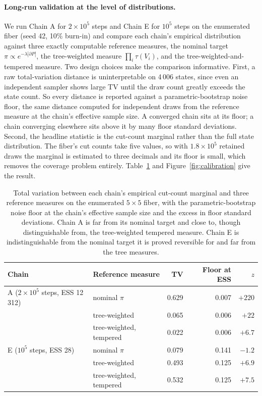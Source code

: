 \documentclass[11pt]{article}
\begin{document}
\paragraph{Long-run validation at the level of distributions.}\label{sec:exp-longrun}
We run Chain A for $2 \times 10^5$ steps and Chain E for $10^5$ steps
on the enumerated fiber (seed 42, 10\% burn-in) and compare each
chain's empirical distribution against three exactly computable
reference measures, the nominal target
$\pi \propto e^{-\lambda|\partial P|}$, the tree-weighted measure
$\prod_i \tau(V_i)$, and the tree-weighted-and-tempered measure. Two
design choices make the comparison informative. First, a raw
total-variation distance is uninterpretable on 4\,006 states, since
even an independent sampler shows large TV until the draw count
greatly exceeds the state count. So every distance is reported
against a parametric-bootstrap noise floor, the same distance
computed for independent draws from the reference measure at the
chain's effective sample size. A converged chain sits at its floor; a
chain converging elsewhere sits above it by many floor standard
deviations. Second, the headline statistic is the cut-count marginal
rather than the full state distribution. The fiber's cut counts take
five values, so with $1.8 \times 10^5$ retained draws the marginal is
estimated to three decimals and its floor is small, which removes the
coverage problem entirely. Table~\ref{tab:calibration-tv} and
Figure~\ref{fig:calibration} give the result.

\begin{table}[htbp]
\centering
\small
\begin{tabular}{llrrr}
\toprule
Chain & Reference measure & TV & Floor at ESS & $z$ \\
\midrule
A ($2\times10^5$ steps, ESS 12\,312) & nominal $\pi$ & 0.629 & 0.007 & $+220$ \\
 & tree-weighted & 0.065 & 0.006 & $+22$ \\
 & tree-weighted, tempered & 0.022 & 0.006 & $+6.7$ \\
\midrule
E ($10^5$ steps, ESS 28) & nominal $\pi$ & 0.079 & 0.141 & $-1.2$ \\
 & tree-weighted & 0.493 & 0.125 & $+6.9$ \\
 & tree-weighted, tempered & 0.532 & 0.125 & $+7.5$ \\
\bottomrule
\end{tabular}
\caption{Total variation between each chain's empirical cut-count
  marginal and three reference measures on the enumerated
  $5 \times 5$ fiber, with the parametric-bootstrap noise floor at the
  chain's effective sample size and the excess in floor standard
  deviations. Chain A is far from its nominal target and close to,
  though distinguishable from, the tree-weighted tempered measure.
  Chain E is indistinguishable from the nominal target it is proved
  reversible for and far from the tree measures.}\label{tab:calibration-tv}
\end{table}
\end{document}
